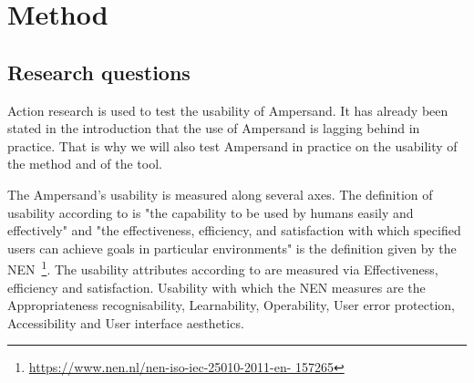 \newpage
\section{Method} \label{Method}

\subsection{Research questions} \label{research_questions}

\begin{comment}
Onderzoeksvraag:
Hoe bruikbaar is Ampersand voor het ontwerpen van register-systemen door middel van het analyseren van wet- en regelgeving in de volksgezondheid en in het bijzonder de Wet-BIG
\end{comment}
Action research is used to test the usability of Ampersand.
It has already been stated in the introduction that the use of Ampersand is lagging behind in practice.
That is why we will also test Ampersand in practice on the usability of the method and of the tool.

The Ampersand's usability is measured along several axes.
The definition of usability according to \cite{shackel_usability_2009} is "the capability to be used by humans easily and effectively" and "the effectiveness,
efficiency, and satisfaction with which specified users can achieve goals in particular environments" is the definition given by the NEN~\footnote{\url{https://www.nen.nl/nen-iso-iec-25010-2011-en- 157265}}.
The usability attributes according to \cite{HORNBAEK200679} are measured via Effectiveness, efficiency and satisfaction.
Usability with which the NEN measures are the Appropriateness recognisability, Learnability, Operability, User error protection, Accessibility and User interface aesthetics.
\begin{comment}
Herkenbaarheid van geschiktheid (Appropriateness recognisability)
    De mate waarin gebruikers kunnen herkennen of een product of systeem geschikt is voor hun behoeften.
Leerbaarheid (Learnability)
    De mate waarin een product of systeem gebruikt kan worden door gespecificeerde gebruikers om gespecificeerde leerdoelen te bereiken met betrekking tot het gebruik van het product of systeem met effectiviteit, efficiëntie, vrijheid van risico en voldoening, in een gespecificeerde gebruikscontext.
Bedienbaarheid (Operability)
    De mate waarin een product of systeem attributen heeft die het makkelijk maken om het te bedienen en beheersen.
Voorkomen gebruikersfouten (User error protection)
    De mate waarin het systeem gebruikers beschermt tegen het maken van fouten.
Volmaaktheid gebruikersinteractie (User interface aesthetics)
    De mate waarin een gebruikersinterface het de gebruiker mogelijk maakt om een plezierige en voldoening gevende interactie te hebben.
Toegankelijkheid (Accessibility)
    De mate waarin een product of systeem gebruikt kan worden door mensen met de meest uiteenlopende eigenschappen en mogelijkheden om een gespecificeerd doel te bereiken in een gespecificeerde gebruikscontext.
\end{comment}

